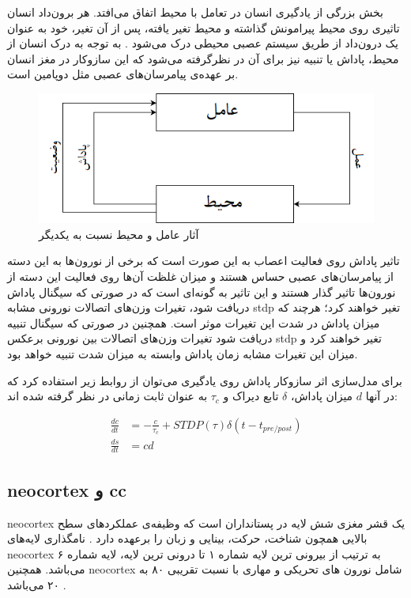 \documentclass[12pt]{report}
\begin{document}
	بخش بزرگی از یادگیری انسان در تعامل با محیط اتفاق می‌افتد. هر برون‌داد انسان تاثیری روی محیط پیرامونش گذاشته و محیط تغیر یافته، پس از آن تغیر، خود به عنوان یک درون‌داد از طریق سیستم عصبی محیطی درک می‌شود
	\cite{sutton1998reinforcement}.
	به توجه به درک انسان از محیط، پاداش یا تنبیه نیز برای آن در نظرگرفته می‌شود که این ساز‌و‌کار در مغز انسان بر عهده‌ی پیامرسان‌های عصبی  مثل دوپامین است. 
	
	\begin{figure}[H]
		\centering
		\includegraphics[width=0.7\linewidth]{rl.png}
		\caption[NS]{
			آثار عامل و محیط نسبت به یکدیگر
		}
		\label{fig:rl}
	\end{figure}
	
	تاثیر پاداش روی فعالیت اعصاب به این صورت است که برخی از نورون‌ها به این دسته از پیامرسان‌‌های عصبی حساس هستند و میزان غلظت آن‌ها روی فعالیت این دسته از نورون‌ها تاثیر گذار هستند و این تاثیر به گونه‌ای است که در صورتی که سیگنال پاداش دریافت شود، تغیرات وزن‌های اتصالات نورونی مشابه \gls{stdp} تغیر خواهند کرد؛ هرچند که میزان پاداش در شدت این تغیرات موثر است. همچنین در صورتی که سیگنال تنبیه دریافت شود تغیرات وزن‌های اتصالات بین نورونی برعکس \gls{stdp} تغیر خواهند کرد و میزان این تغیرات مشابه زمان پاداش وابسته به میزان شدت تنبیه خواهد بود.
	
	برای مدل‌سازی اثر سازوکار پاداش روی یادگیری می‌توان از روابط زیر استفاده کرد که در آنها $d$ میزان پاداش، $\delta$ تابع دیراک و $\tau_c$ به عنوان ثابت زمانی در نظر گرفته شده اند:
	
	\begin{align}
		\frac{dc}{dt} &= -\frac{c}{\tau_c} + STDP(\tau) \delta(t-t_{pre/post}) \\
		\frac{ds}{dt} &= cd
		\label{eq:rstdp}
	\end{align}
	
	
	\subsection{\gls{neocortex} و \gls{cc}}
	\gls{neocortex} یک قشر مغزی شش لایه در پستانداران است که وظیفه‌ی عملکرد‌های سطح بالایی همچون شناخت، حرکت، بینایی و زبان را برعهده دارد
	\cite{Lui2011}. نامگذاری لایه‌های \gls{neocortex} به ترتیب از بیرونی ترین لایه شماره ۱ تا درونی ترین لایه، لایه شماره ۶ می‌باشد.
	همچنین \gls{neocortex} شامل نورون های تحریکی و مهاری با نسبت تقریبی ۸۰ به ۲۰ می‌باشد
	\cite{noback2005human}.
	
\end{document}
